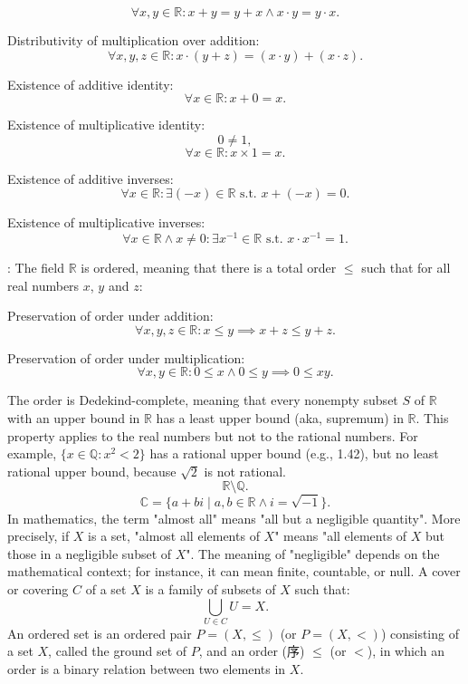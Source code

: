 \documentclass[a4paper,12pt]{article}
\begin{document}
\[\forall x,y\in\mathbb{R}\colon x+y=y+x\land x\cdot y=y\cdot x.\]
\item Distributivity of multiplication over addition:
\[\forall x,y,z\in\mathbb{R}\colon x\cdot(y+z)=(x\cdot y)+(x\cdot z).\]
\item Existence of additive identity:
\[\forall x\in\mathbb{R}\colon x+0=x.\]
\item Existence of multiplicative identity:
\[0\neq 1,\]
\[\forall x\in\mathbb{R}\colon x\times 1=x.\]
\item Existence of additive inverses:
\[\forall x\in\mathbb{R}\colon\exists(-x)\in\mathbb{R}\text{\ s.t.\ }x+(-x)=0.\]
\item Existence of multiplicative inverses:
\[\forall x\in\mathbb{R}\land x\neq 0\colon\exists x^{-1}\in\mathbb{R}\text{\ s.t.\ }x\cdot x^{-1}=1.\]
\eit
\item {}: The field $\mathbb{R}$ is ordered, meaning that there is a total order $\leq$ such that for all real numbers $x$, $y$ and $z$:
\bit
\item Preservation of order under addition:
\[\forall x,y,z\in\mathbb{R}\colon x\leq y\implies x+z\leq y+z.\]
\item Preservation of order under multiplication:
\[\forall x,y\in\mathbb{R}\colon 0\leq x\land 0\leq y\implies 0\leq xy.\]
\item The order is Dedekind-complete, meaning that every nonempty subset $S$ of $\mathbb{R}$ with an upper bound in $\mathbb{R}$ has a least upper bound (aka, supremum) in $\mathbb{R}$. This property applies to the real numbers but not to the rational numbers. For example, $\{x\in\mathbb{Q}\colon x^2<2\}$ has a rational upper bound (e.g., 1.42), but no least rational upper bound, because $\sqrt{2}$ is not rational.
\eit\eit
{}
\[\mathbb{R}\setminus\mathbb{Q}.\]
\[\mathbb{C}=\{a+bi\mid a,b\in\mathbb{R}\land i=\sqrt{-1}\}.\]
In mathematics, the term "almost all" means "all but a negligible quantity". More precisely, if $X$ is a set, "almost all elements of $X$" means "all elements of $X$ but those in a negligible subset of $X$". The meaning of "negligible" depends on the mathematical context; for instance, it can mean finite, countable, or null.
A cover or covering $C$ of a set $X$ is a family of subsets of $X$ such that:
\[\bigcup_{U\in C}U=X.\]
An ordered set is an ordered pair $P=(X,\leq )$ (or $P=(X,<)$) consisting of a set $X$, called the ground set of $P$, and an order (序) $\leq$ (or $<$), in which an order is a binary relation between two elements in $X$.
\end{document}

